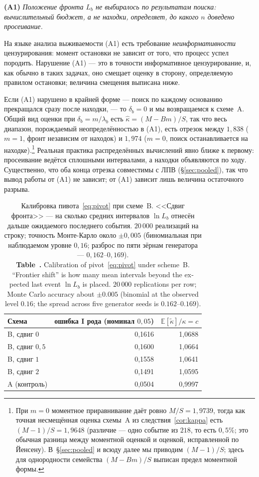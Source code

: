 \documentclass[11pt,a4paper]{article}
\newcommand{\encaptab}[1]{\\[3pt]\foreignlanguage{english}{%
  \textbf{Table~\thetable.} #1}}
\theoremstyle{plain}
\theoremstyle{remark}
\begin{document}
\medskip
\noindent\textbf{(A1)} \emph{Положение фронта $L_b$ не выбиралось по результатам поиска:
вычислительный бюджет, а не находки, определяет, до какого $n$ доведено просеивание.}

\medskip
\noindent На языке анализа выживаемости (A1) есть требование
\emph{неинформативности} цензурирования: момент остановки не зависит от того,
что процесс успел породить. Нарушение (A1) --- это в точности информативное
цензурирование, и, как обычно в таких задачах, оно смещает оценку в сторону,
определяемую правилом остановки; величина смещения выписана ниже.

\medskip
\noindent Если (A1) нарушено в крайней форме --- поиск по каждому основанию прекращался
сразу после находки, --- то $\delta_b=0$ и мы возвращаемся к схеме~A. Общий вид оценки
при $\delta_b=m/\lambda_b$ есть $\hat\kappa=(M-Bm)/S$, так что весь диапазон,
порождаемый неопределённостью в (A1), есть отрезок между $1{,}838$ ($m=1$, фронт
независим от находок) и $1{,}974$ ($m=0$, поиск останавливается на находке).\footnote{%
При $m=0$ моментное приравнивание даёт ровно $M/S=1{,}9739$, тогда как точная
несмещённая оценка схемы~A из следствия~\ref{cor:kappa} есть $(M-1)/S=1{,}9648$
(различие --- одно событие из $218$, то есть $0{,}5\%$; это обычная разница между
моментной оценкой и оценкой, исправленной по Йенсену). В~\S\ref{sec:pooled} и всюду
далее мы приводим $(M-1)/S$; здесь для однородности семейства $(M-Bm)/S$ выписан
предел моментной формы.}
Реальная практика распределённых вычислений явно ближе к первому: просеивание ведётся
сплошными интервалами, а находки объявляются по ходу. Существенно, что оба конца
отрезка совместимы с ЛПВ (\S\ref{sec:pooled}), так что вывод работы от (A1) не зависит;
от (A1) зависит лишь величина остаточного разрыва.

\begin{table}[t]
\centering
\caption{Калибровка пивота~\eqref{eq:pivot} при схеме~B. <<Сдвиг фронта>> --- на сколько
средних интервалов $\ln L_b$ отнесён дальше ожидаемого последнего события.
$20\,000$ реализаций на строку; точность Монте-Карло около $\pm0{,}005$
(биномиальная при наблюдаемом уровне $0{,}16$; разброс по пяти зёрнам
генератора --- $0{,}162$--$0{,}169$).
\encaptab{Calibration of pivot~\eqref{eq:pivot} under scheme~B. ``Frontier shift''
is how many mean intervals beyond the expected last event $\ln L_b$ is placed.
$20\,000$ replications per row; Monte Carlo accuracy about $\pm0.005$ (binomial at
the observed level $0.16$; the spread across five generator seeds is
$0.162$--$0.169$).}}
\label{tab:calib}
\small
\begin{tabular}{lrr}
\toprule
Схема & ошибка I рода (номинал $0{,}05$) & $\mathbb E[\tilde\kappa]/\kappa=c$\\
\midrule
B, сдвиг $0$ & 0{,}1616 & 1{,}0688\\
B, сдвиг $0{,}5$ & 0{,}1600 & 1{,}0664\\
B, сдвиг $1$ & 0{,}1558 & 1{,}0641\\
B, сдвиг $2$ & 0{,}1491 & 1{,}0595\\
A (контроль) & 0{,}0504 & 0{,}9997\\
\bottomrule
\end{tabular}
\end{table}
\end{document}

